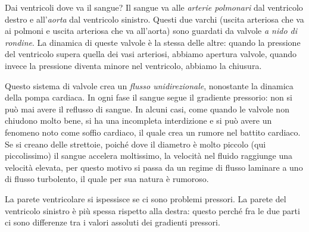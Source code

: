 \documentclass[a4paper,12pt]{article}
\begin{document}
Dai ventricoli dove va il sangue? Il sangue va alle \emph{arterie polmonari} dal ventricolo destro e all'\emph{aorta} dal ventricolo sinistro. Questi due varchi (uscita arteriosa che va ai polmoni e uscita arteriosa che va all'aorta) sono guardati da valvole \emph{a nido di rondine}. La dinamica di queste valvole è la stessa delle altre: quando la pressione del ventricolo supera quella dei vasi arteriosi, abbiamo apertura valvole, quando invece la pressione diventa minore nel ventricolo, abbiamo la chiusura.

Questo sistema di valvole crea un \emph{flusso unidirezionale}, nonostante la dinamica della pompa cardiaca. In ogni fase il sangue segue il gradiente pressorio: non si può mai avere il reflusso di sangue. In alcuni casi, come quando le valvole non chiudono molto bene, si ha una incompleta interdizione e si può avere un fenomeno noto come soffio cardiaco, il quale crea un rumore nel battito cardiaco. Se si creano delle strettoie, poiché dove il diametro è molto piccolo (qui piccolissimo) il sangue accelera moltissimo, la velocità nel fluido raggiunge una velocità elevata, per questo motivo si passa da un regime di flusso laminare a uno di flusso turbolento, il quale per sua natura è rumoroso. 

La parete ventricolare si ispessisce se ci sono problemi pressori. La parete del ventricolo sinistro è più spessa rispetto alla destra: questo perché fra le due parti ci sono differenze tra i valori assoluti dei gradienti pressori. 
\end{document}
